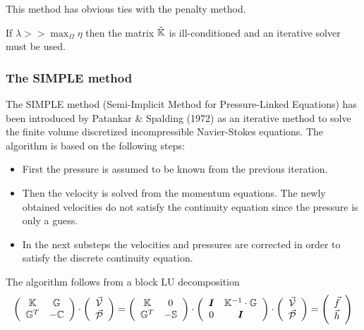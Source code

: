 \begin{remark} 
This method has obvious ties with the penalty method. 
\end{remark}

\begin{remark} 
If $\lambda >> \max_\Omega{\eta}$ then the matrix $\tilde{{\mathbb{K}}}$ is ill-conditioned and an iterative solver must be used.
\end{remark}

\subsubsection{The SIMPLE method}

The SIMPLE method (Semi-Implicit Method for Pressure-Linked Equations)
has been introduced by Patankar \& Spalding (1972) \cite{pasp72} as an iterative method to solve
the finite volume discretized incompressible Navier-Stokes equations. The algorithm
is based on the following steps:
\begin{itemize}
\item First the pressure is assumed to be known from the previous iteration.
\item Then the velocity is solved from the momentum equations. The newly obtained
velocities do not satisfy the continuity equation since the pressure is only a
guess.
\item In the next substeps the velocities and pressures are corrected in order to
satisfy the discrete continuity equation.
\end{itemize}
The algorithm follows from a block LU decomposition
\begin{equation}
\left(
\begin{array}{cc}
{\mathbb{K}} & {\mathbb{G}} \\ {\mathbb{G}}^T & -{\mathbb{C}} 
\end{array}
\right)
\cdot
\left(
\begin{array}{c}
\vec{\cal V} \\ \vec{\cal P}
\end{array}
\right)
=
\left(
\begin{array}{cc}
{\mathbb{K}} & 0 \\ 
{\mathbb{G}}^T & -{\mathbb{S}}
\end{array}
\right)
\cdot
\left(
\begin{array}{cc}
{\bm I} & {\mathbb{K}}^{-1} \cdot {\mathbb{G}} \\
0 & {\bm I} 
\end{array}
\right)
\cdot
\left(
\begin{array}{c}
\vec{\cal V} \\ \vec{\cal P}
\end{array}
\right)
=
\left(
\begin{array}{c}
\vec{f} \\ \vec{h}
\end{array}
\right)
\end{equation}

